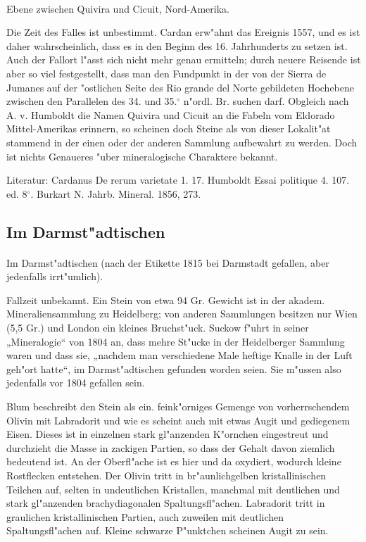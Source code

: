 \documentclass[a4paper, 11pt, oneside]{article}
\begin{document}
\paragraph{}
Ebene zwischen Quivira und Cicuit, Nord-Amerika.

Die Zeit des Falles ist unbestimmt. Cardan erw"ahnt das Ereignis 1557, und es ist daher wahrscheinlich, dass es in den Beginn des 16. Jahrhunderts zu setzen ist. Auch der Fallort l"asst sich nicht mehr genau ermitteln; durch neuere Reisende ist aber so viel festgestellt, dass man den Fundpunkt in der von der Sierra de Jumanes auf der "ostlichen Seite des Rio grande del Norte gebildeten Hochebene zwischen den Parallelen des 34. und 35.$^\circ$ n"ordl. Br. suchen darf. Obgleich nach A. v. Humboldt die Namen Quivira und Cicuit an die Fabeln vom Eldorado Mittel-Amerikas erinnern, so scheinen doch Steine als von dieser Lokalit"at stammend in der einen oder der anderen Sammlung aufbewahrt zu werden. Doch ist nichts Genaueres "uber mineralogische Charaktere bekannt.

\footnotesize
Literatur: Cardanus De rerum varietate 1. 17. Humboldt Essai politique 4. 107. ed. 8$^\circ$. Burkart N. Jahrb. Mineral. 1856, 273.

\subsection{Im Darmst"adtischen}
\normalsize
\paragraph{}
Im Darmst"adtischen (nach der Etikette 1815 bei Darmstadt gefallen, aber jedenfalls irrt"umlich).

Fallzeit unbekannt. Ein Stein von etwa 94 Gr. Gewicht ist in der akadem. Mineraliensammlung zu Heidelberg; von anderen Sammlungen besitzen nur Wien (5,5 Gr.) und London ein kleines Bruchst"uck. Suckow f"uhrt in seiner „Mineralogie“ von 1804 an, dass mehre St"ucke in der Heidelberger Sammlung waren und dass sie, „nachdem man verschiedene Male heftige Knalle in der Luft geh"ort hatte“, im Darmst"adtischen gefunden worden seien. Sie m"ussen also jedenfalls vor 1804 gefallen sein.

Blum beschreibt den Stein als ein. feink"orniges Gemenge von vorherrschendem Olivin mit Labradorit und wie es scheint auch mit etwas Augit und gediegenem Eisen. Dieses ist in einzelnen stark gl"anzenden K"ornchen eingestreut und durchzieht die Masse in zackigen Partien, so dass der Gehalt davon ziemlich bedeutend ist. An der Oberfl"ache ist es hier und da oxydiert, wodurch kleine Rostflecken entstehen. Der Olivin tritt in br"aunlichgelben kristallinischen Teilchen auf, selten in undeutlichen Kristallen, manchmal mit deutlichen und stark gl"anzenden brachydiagonalen Spaltungsfl"achen. Labradorit tritt in graulichen kristallinischen Partien, auch zuweilen mit deutlichen Spaltungsfl"achen auf. Kleine schwarze P"unktchen scheinen Augit zu sein.
\end{document}
